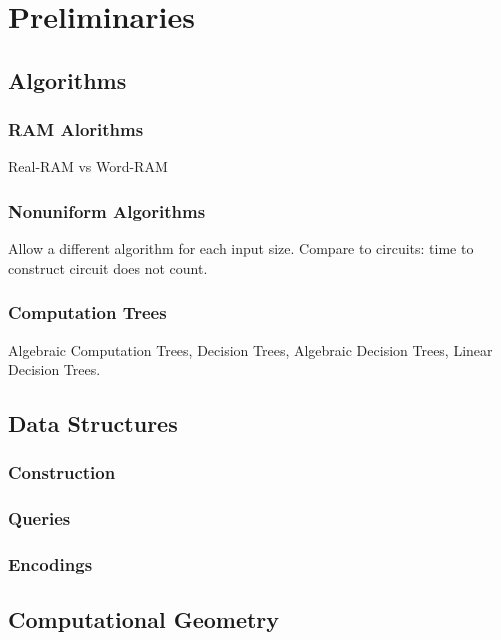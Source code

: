 \part{Preliminaries}

\chapter{Algorithms}

\section{RAM Alorithms}

Real-RAM vs Word-RAM

\section{Nonuniform Algorithms}

Allow a different algorithm for each input size.
Compare to circuits: time to construct circuit does not count.

\section{Computation Trees}

Algebraic Computation Trees,
Decision Trees,
Algebraic Decision Trees,
Linear Decision Trees.


\chapter{Data Structures}

\section{Construction}

\section{Queries}

\section{Encodings}


\chapter{Computational Geometry}

